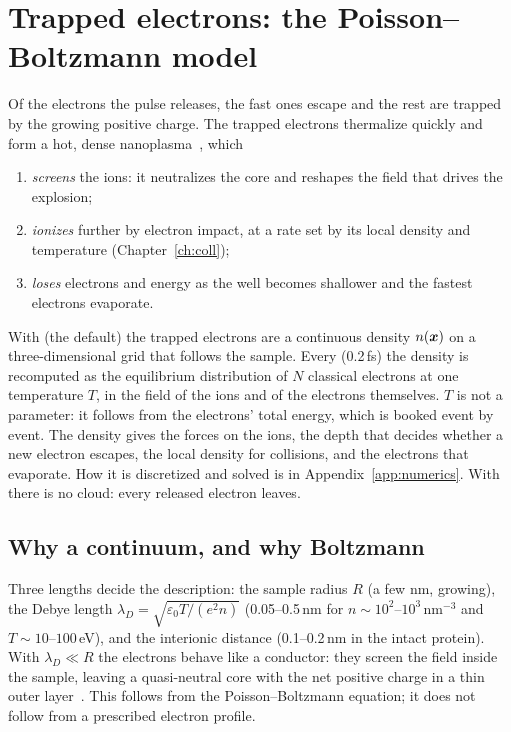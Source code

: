 \chapter{Trapped electrons: the Poisson--Boltzmann model}
\label{ch:pb}

Of the electrons the pulse releases, the fast ones escape and the rest are trapped by the growing positive charge.
The trapped electrons thermalize quickly and form a hot, dense nanoplasma~\cite{ditmire1996,saalmann2006,fennel2010},
which
\begin{enumerate}
  \item \emph{screens} the ions: it neutralizes the core and reshapes the field that drives the explosion;
  \item \emph{ionizes} further by electron impact, at a rate set by its local density and temperature
    (Chapter~\ref{ch:coll});
  \item \emph{loses} electrons and energy as the well becomes shallower and the fastest electrons evaporate.
\end{enumerate}
With  (the default) the trapped electrons are a continuous density $n(\bm{x})$ on a
three-dimensional grid that follows the sample.
Every  (0.2\,fs) the density is recomputed as the equilibrium distribution of $N$ classical
electrons at one temperature $T$, in the field of the ions and of the electrons themselves.
$T$ is not a parameter: it follows from the electrons' total energy, which is booked event by event.
The density gives the forces on the ions, the depth that decides whether a new electron escapes, the local density
for collisions, and the electrons that evaporate.
How it is discretized and solved is in Appendix~\ref{app:numerics}.
With  there is no cloud: every released electron leaves.

\section{Why a continuum, and why Boltzmann}

Three lengths decide the description: the sample radius $R$ (a few nm, growing), the Debye length
$\lambda_D = \sqrt{\varepsilon_0T/(e^2n)}$ (0.05--0.5\,nm for $n\sim10^2$--$10^3$\,nm$^{-3}$ and $T\sim10$--$100$\,eV), and
the interionic distance (0.1--0.2\,nm in the intact protein).
With $\lambda_D\ll R$ the electrons behave like a conductor: they screen the field inside the sample, leaving a
quasi-neutral core with the net positive charge in a thin outer layer~\cite{chen2016}.
This follows from the Poisson--Boltzmann equation; it does not follow from a prescribed electron profile.

